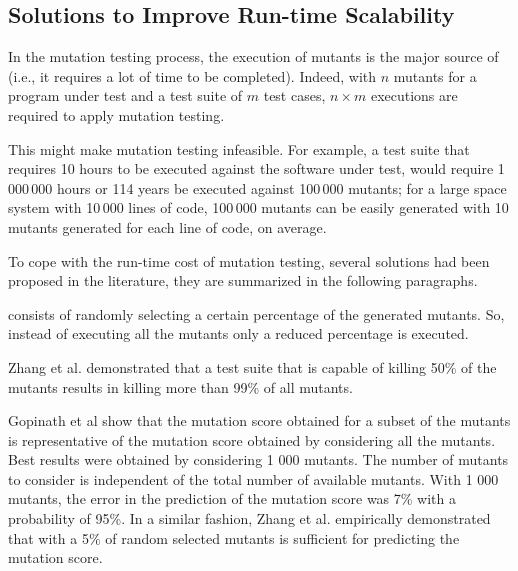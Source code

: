 \clearpage
\subsection{Solutions to Improve Run-time Scalability}
\label{sec:opt:execution}

In the mutation testing process, the execution of mutants is the major source of  (i.e., it requires a lot of time to be completed). Indeed, with $n$ mutants for a program under test and a test suite of $m$ test cases, $n \times m$ executions are required to apply mutation testing.

This might make mutation testing infeasible. For example, a test suite that requires 10 hours to be executed against the software under test, would require 1\,000\,000 hours or 114 years be executed against 100\,000 mutants; for a large space system with 10\,000 lines of code, 100\,000 mutants can be easily generated  with 10 mutants generated for each line of code, on average.

To cope with the run-time cost of mutation testing, several solutions had been proposed in the literature, they are summarized in the following paragraphs.

 consists of  randomly selecting a certain percentage of the generated mutants. So, instead of executing all the mutants only a reduced percentage is executed.

Zhang et al. \cite{zhang2010operator} demonstrated that a test suite that is capable of killing 50\% of the mutants results in killing more than 99\% of all mutants.

Gopinath et al \cite{gopinath2015hard} show that the mutation score obtained for a subset of the mutants is representative of the mutation score obtained by considering all the mutants. Best results were obtained by considering 1 000 mutants. The number of mutants to consider is independent of the total number of available mutants. With 1 000 mutants, the error in the prediction of the mutation score was 7\% with a probability of 95\%. 
In a similar fashion, Zhang et al. \cite{zhang2013operator} empirically demonstrated that with a 5\% of random selected mutants is sufficient for predicting the mutation score. 


